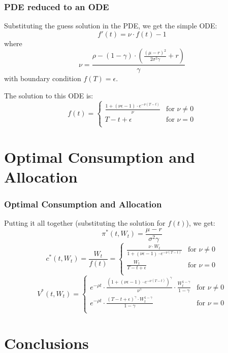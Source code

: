 \documentclass{beamer}
\begin{document}
\begin{frame}
\frametitle{PDE reduced to an ODE}
Substituting the guess solution in the PDE, we get the simple ODE:
$$f'(t) = \nu \cdot f(t) - 1$$
where $$\nu = \frac {\rho - (1 - \gamma) \cdot (\frac {(\mu - r)^2} {2 \sigma^2 \gamma} + r)} {\gamma}$$
with boundary condition $f(T) = \epsilon$.

The solution to this ODE is:
$$
f(t) =
\begin{cases}
\frac {1 + (\nu \epsilon - 1) \cdot e^{-\nu (T-t)}} {\nu} & \text{for } \nu \neq 0 \\
T-t+\epsilon & \text{for } \nu = 0 \\
\end{cases}
$$
\end{frame}

\section{Optimal Consumption and Allocation}
\begin{frame}
\frametitle{Optimal Consumption and Allocation}
Putting it all together (substituting the solution for $f(t)$), we get:
$$\pi^*(t, W_t) = \frac {\mu - r} {\sigma^2 \gamma}$$
$$
c^*(t, W_t)= \frac {W_t} {f(t)} = 
\begin{cases}
\frac {\nu \cdot W_t} {1 + (\nu \epsilon - 1) \cdot e^{-\nu (T-t)}} & \text{for } \nu \neq 0\\
\frac {W_t} {T-t+\epsilon} & \text{for } \nu = 0\\
\end{cases}
$$
$$
V^*(t, W_t) = 
\begin{cases}
e^{-\rho t} \cdot \frac {(1 + (\nu \epsilon - 1) \cdot e^{-\nu (T-t)})^{\gamma}} {\nu^{\gamma}} \cdot \frac {W_t^{1-\gamma}} {1-\gamma} & \text{for } \nu \neq 0\\
e^{-\rho t} \cdot \frac {(T-t+\epsilon)^\gamma \cdot W_t^{1 - \gamma}} {1-\gamma} & \text{for } \nu = 0\\
\end{cases}
$$
\end{frame}

\section{Conclusions}
\end{document}
